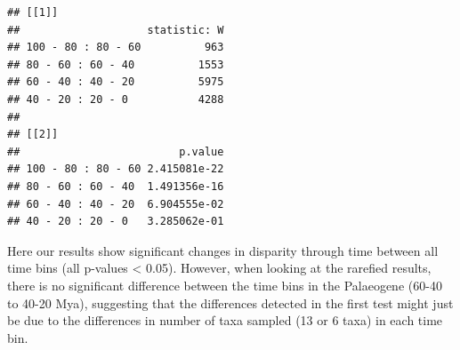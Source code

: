 \documentclass[]{book}
\begin{document}
\begin{verbatim}
## [[1]]
##                    statistic: W
## 100 - 80 : 80 - 60          963
## 80 - 60 : 60 - 40          1553
## 60 - 40 : 40 - 20          5975
## 40 - 20 : 20 - 0           4288
## 
## [[2]]
##                         p.value
## 100 - 80 : 80 - 60 2.415081e-22
## 80 - 60 : 60 - 40  1.491356e-16
## 60 - 40 : 40 - 20  6.904555e-02
## 40 - 20 : 20 - 0   3.285062e-01
\end{verbatim}

Here our results show significant changes in disparity through time between all time bins (all p-values \textless{} 0.05).
However, when looking at the rarefied results, there is no significant difference between the time bins in the Palaeogene (60-40 to 40-20 Mya), suggesting that the differences detected in the first test might just be due to the differences in number of taxa sampled (13 or 6 taxa) in each time bin.


\end{document}
